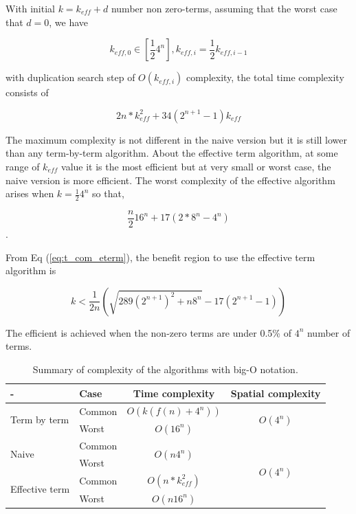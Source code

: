 \documentclass[twocolumn]{article}
\begin{document}
With initial $k = k_{eff} +d$ number non zero-terms,
assuming that the worst case that $d=0$, we have 

\begin{equation}
    k_{eff, 0} \in [\frac{1}{2}4^{n}], k_{eff, i} = \frac{1}{2} k_{eff, i-1}
\end{equation}

with duplication search step of $O(k_{eff, i})$ complexity,
the total time complexity consists of 

\begin{equation}
    \label{eq:t_com_eterm}
    2 n * k_{eff}^2 + 34 (2^{n+1} -1) k_{eff}
\end{equation} 

The maximum complexity is not different in the naive version but it is still
lower than any term-by-term algorithm. About the effective term algorithm,
at some range of $k_{eff}$ value it is the most efficient but 
at very small or worst case, the naive version is more efficient. 
The worst complexity of the effective algorithm arises 
when $k=\frac{1}{2}4^n$ so that,

\begin{equation}
    \frac{n}{2} 16^n + 17 (2 * 8^n - 4^n) 
\end{equation}.

From Eq (\ref{eq:t_com_eterm}), the benefit region to use 
the effective term algorithm is 

\begin{equation}
    k < \frac{1}{2n} \left(\sqrt{289(2^{n+1})^2 + n 8^n} - 17 (2^{n+1} -1) \right) 
\end{equation}

The efficient is achieved when the non-zero terms are under 0.5\% of $4^n$ number of terms.

\begin{table}
    \centering
    \caption{Summary of complexity of the algorithms with big-O notation.}
    \label{table:complexity}
    \begin{tabular}{l|l|cc}
        -                                & Case      & Time complexity                   & Spatial complexity\\
        \hline
        \multirow{2}{8em}{Term by term}  & Common    & $O(k(f(n) +4^n))$                 & \multirow{2}{2em}{$O(4^n)$}\\
                                         & Worst     & $O(16^n)$                         &\\
        \multirow{2}{8em}{Naive}         & Common    &\multirow{2}{1em}{$O(n4^n)$}        & \multirow{4}{2em}{$O(4^n)$}\\
                                         & Worst     &                                   &\\
        \multirow{2}{8em}{Effective term}& Common    &$O(n * k_{eff}^2)$                 & \\
                                         & Worst     &$O(n16^n)$                         & \\
        \hline                                      
    \end{tabular}
\end{table}
\end{document}
